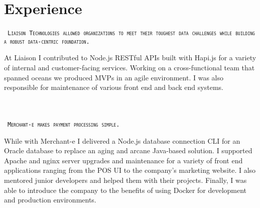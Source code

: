 \documentclass{muratcan_cv}
\begin{document}
\headerview
\vspace{1ex}
%
%
\section{Experience}
    \mbox { \scshape \hspace{1.2em} \tiny{\texttt{Liaison Technologies allowed organizations
     to meet their toughest data challenges while building a robust data-centric foundation.}}}\\
    \indent \indent \begin{minipage}{0.96\linewidth} \footnotesize
     At Liaison I contributed to Node.js RESTful APIs built with Hapi.js for a variety of internal and customer-facing services. Working on a cross-functional team that spanned oceans we produced MVPs in an agile environment. I was also responsible for maintenance of various front end and back end systems.
    \end{minipage} \\[0.1cm]\\
    \mbox { \scshape \hspace{1.2em} \tiny{\texttt{Merchant-e makes payment processing simple.}}}\\
    \indent \indent \begin{minipage}{0.96\linewidth} \footnotesize
     While with Merchant-e I delivered a Node.js database connection CLI for an Oracle database to replace an aging and arcane Java-based solution. I supported Apache and nginx server upgrades and maintenance for a variety of front end applications ranging from the POS UI to the company's marketing website. I also mentored junior developers and helped them with their projects. Finally, I was able to introduce the company to the benefits of using Docker for development and production environments.
    \end{minipage} \\[0.1cm]\\
\end{document}
